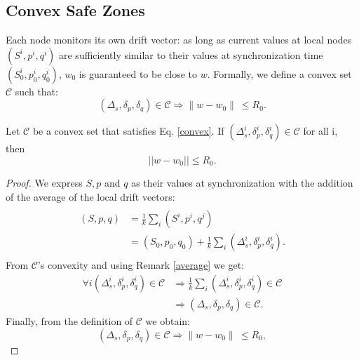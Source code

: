 \subsection{Convex Safe Zones}
Each node monitors its own drift vector: as long as current values
at local nodes $(S^i,p^i,q^i)$ are sufficiently similar to their values
at synchronization time $(S^i_0,p^i_0,q^i_0)$, $w_0$ is guaranteed to be close to $w$.
Formally, we define a convex set $\mathcal{C}$ such that:
\begin{equation} \label{convex}
(\Delta_s, \delta_p, \delta_q) \in \mathcal{C} \Rightarrow \parallel w-w_0
\parallel \ \leq R_0.
\end{equation}
\begin{lemma} \label{averages}
Let $\mathcal{C}$ be a convex set that satisfies Eq. \ref{convex}.
If $(\Delta_s^i, \delta_p^i, \delta_q^i) \in \mathcal{C}$ for all i, then
\begin{equation*}
||w-w_0|| \leq R_0.
\end{equation*}
\end{lemma}
\begin{proof}
We express $S, p$ and $q$ as their values at synchronization with the addition of the average of the local drift vectors:
\begin{equation}
\begin{split}
\\(S,p,q) & = \frac{1}{k} \sum_i (S^i,p^i,q^j) \\
 & = (S_0,p_0,q_0) + \frac{1}{k} \sum_i (\Delta_s^i,\delta^i_p,\delta_q^i). \\
\end{split}
\end{equation}
From $\mathcal{C}$'s convexity and using Remark \ref{average} we get:
\begin{equation}
\begin{split}
\forall i (\Delta_s^i,\delta^i_p,\delta_q^i) \in \mathcal{C} & \Rightarrow
\frac{1}{k} \sum_i (\Delta_s^i,\delta^i_p,\delta_q^i) \in \mathcal{C} \\
& \Rightarrow (\Delta_s,\delta_p,\delta_q) \in \mathcal{C}.
\end{split}
\end{equation}
Finally, from the definition of $\mathcal{C}$ we obtain:
\begin{equation}
(\Delta_s,\delta_p,\delta_q) \in \mathcal{C} \Rightarrow \parallel w-w_0
\parallel \ \leq R_0,
\end{equation}
\end{proof}

